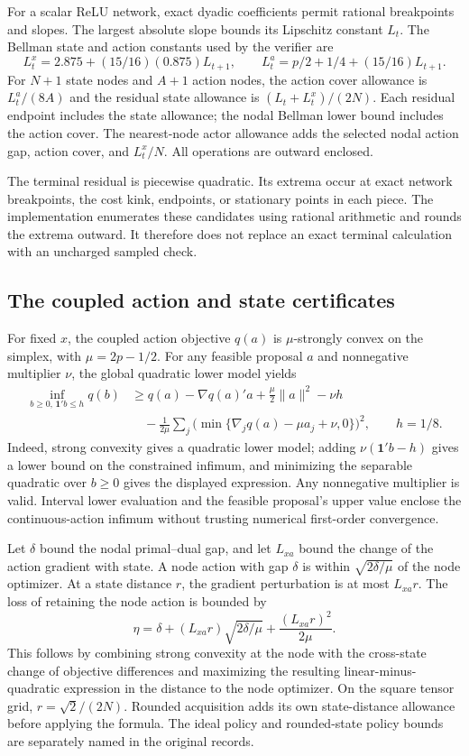 \documentclass[ecta,nameyear,draft]{econsocart}
\begin{document}
For a scalar ReLU network, exact dyadic coefficients permit rational breakpoints and slopes. The largest absolute slope bounds its Lipschitz constant $L_t$. The Bellman state and action constants used by the verifier are
\[
 L_t^x=2.875+(15/16)(0.875)L_{t+1},\qquad
 L_t^a=p/2+1/4+(15/16)L_{t+1}.
\]
For $N+1$ state nodes and $A+1$ action nodes, the action cover allowance is $L_t^a/(8A)$ and the residual state allowance is $(L_t+L_t^x)/(2N)$. Each residual endpoint includes the state allowance; the nodal Bellman lower bound includes the action cover. The nearest-node actor allowance adds the selected nodal action gap, action cover, and $L_t^x/N$. All operations are outward enclosed.

The terminal residual is piecewise quadratic. Its extrema occur at exact network breakpoints, the cost kink, endpoints, or stationary points in each piece. The implementation enumerates these candidates using rational arithmetic and rounds the extrema outward. It therefore does not replace an exact terminal calculation with an uncharged sampled check.

\subsection{The coupled action and state certificates}
For fixed $x$, the coupled action objective $q(a)$ is $\mu$-strongly convex on the simplex, with $\mu=2p-1/2$. For any feasible proposal $a$ and nonnegative multiplier $\nu$, the global quadratic lower model yields
\begin{align*}
 \inf_{b\geq0,\,\mathbf1'b\leq h}q(b)
 &\geq q(a)-\nabla q(a)'a+\tfrac\mu2\|a\|^2-\nu h\\
 &\quad-\frac1{2\mu}\sum_j
          \bigl(\min\{\nabla_jq(a)-\mu a_j+\nu,0\}\bigr)^2,
 \qquad h=1/8.
\end{align*}
Indeed, strong convexity gives a quadratic lower model; adding $\nu(\mathbf1'b-h)$ gives a lower bound on the constrained infimum, and minimizing the separable quadratic over $b\geq0$ gives the displayed expression. Any nonnegative multiplier is valid. Interval lower evaluation and the feasible proposal's upper value enclose the continuous-action infimum without trusting numerical first-order convergence.

Let $\delta$ bound the nodal primal--dual gap, and let $L_{xa}$ bound the change of the action gradient with state. A node action with gap $\delta$ is within $\sqrt{2\delta/\mu}$ of the node optimizer. At a state distance $r$, the gradient perturbation is at most $L_{xa}r$. The loss of retaining the node action is bounded by
\[
 \eta=\delta+(L_{xa}r)\sqrt{2\delta/\mu}
                 +\frac{(L_{xa}r)^2}{2\mu}.
\]
This follows by combining strong convexity at the node with the cross-state change of objective differences and maximizing the resulting linear-minus-quadratic expression in the distance to the node optimizer. On the square tensor grid, $r=\sqrt2/(2N)$. Rounded acquisition adds its own state-distance allowance before applying the formula. The ideal policy and rounded-state policy bounds are separately named in the original records.
\end{document}

